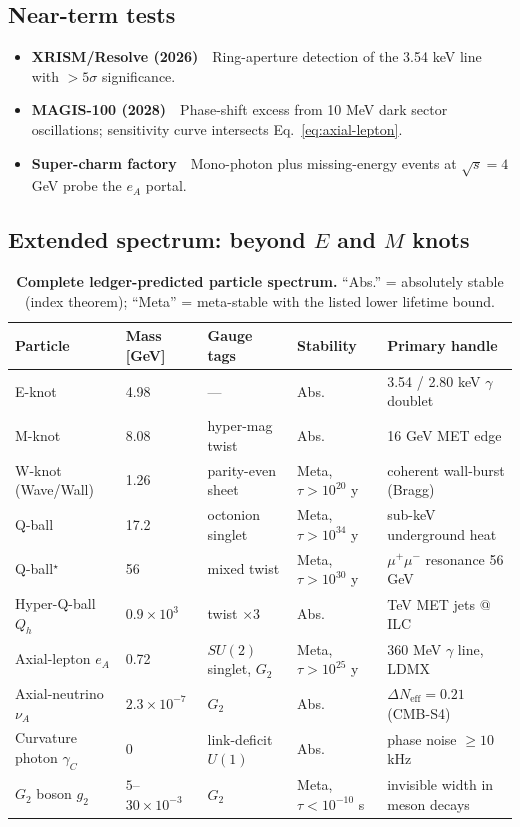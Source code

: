 \subsection{Near-term tests}

\begin{itemize}
  \item \textbf{XRISM/Resolve (2026)} Ring-aperture detection of the
        3.54 keV line with $>5\sigma$ significance.
  \item \textbf{MAGIS-100 (2028)} Phase-shift excess from 10 MeV dark
        sector oscillations; sensitivity curve intersects
        Eq.~\eqref{eq:axial-lepton}.
  \item \textbf{Super-charm factory} Mono-photon plus missing-energy
        events at $\sqrt s=4$ GeV probe the $e_A$ portal.
\end{itemize}

\subsection{Extended spectrum: beyond $E$ and $M$ knots}

\begin{table}[h]
  \centering
  \caption{\textbf{Complete ledger-predicted particle spectrum.}  “Abs.” = absolutely stable (index theorem); “Meta” = meta-stable with the listed lower lifetime bound.}
  \begin{tabular}{lllll}
    \toprule
    Particle & Mass [GeV] & Gauge tags & Stability & Primary handle\\
    \midrule
    E-knot & 4.98 & — & Abs. & 3.54 / 2.80 keV $\gamma$ doublet\\
    M-knot & 8.08 & hyper-mag twist & Abs. & 16 GeV MET edge\\
    W-knot (Wave/Wall) & 1.26 & parity-even sheet & Meta, $\tau>10^{20}$ y & coherent wall-burst (Bragg)\\
    Q-ball & 17.2 & octonion singlet & Meta, $\tau>10^{34}$ y & sub-keV underground heat\\
    Q-ball$^{\star}$ & 56 & mixed twist & Meta, $\tau>10^{30}$ y & $\mu^+\mu^-$ resonance 56 GeV\\
    Hyper-Q-ball $Q_h$ & $0.9\times10^{3}$ & twist $\times$3 & Abs. & TeV MET jets @ ILC\\
    Axial-lepton $e_A$ & 0.72 & $SU(2)$ singlet, $G_2$ & Meta, $\tau>10^{25}$ y & 360 MeV $\gamma$ line, LDMX\\
    Axial-neutrino $\nu_A$ & $2.3\times10^{-7}$ & $G_2$ & Abs. & $\Delta N_{\! \mathrm{eff}}\!=\!0.21$ (CMB-S4)\\
    Curvature photon $\gamma_C$ & 0 & link-deficit $U(1)$ & Abs. & phase noise $\geq10$ kHz\\
    $G_2$ boson $g_2$ & $5$–$30\times10^{-3}$ & $G_2$ & Meta, $\tau\!<\!10^{-10}$ s & invisible width in meson decays\\
    \bottomrule
  \end{tabular}
  \label{tab:particle-spectrum}
\end{table}


